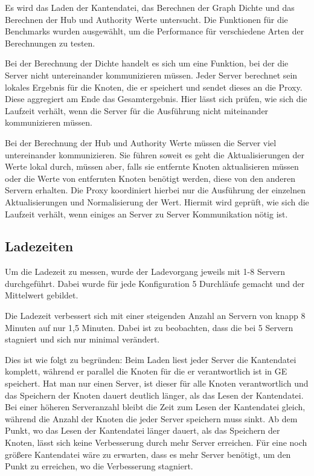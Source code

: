 Es wird das Laden der Kantendatei, das Berechnen der Graph Dichte und das Berechnen der Hub und Authority Werte untersucht. Die Funktionen für die Benchmarks wurden ausgewählt, um die Performance für verschiedene Arten der Berechnungen zu testen.

Bei der Berechnung der Dichte handelt es sich um eine Funktion, bei der die Server nicht untereinander kommunizieren müssen. Jeder Server berechnet sein lokales Ergebnis für die Knoten, die er speichert und sendet dieses an die Proxy. 
Diese aggregiert am Ende das Gesamtergebnis. Hier lässt sich prüfen, wie sich die Laufzeit verhält, wenn die Server für die Ausführung nicht miteinander kommunizieren müssen.

Bei der Berechnung der Hub und Authority Werte müssen die Server viel untereinander kommunizieren. Sie führen soweit es geht die Aktualisierungen der Werte lokal durch, müssen aber, falls sie entfernte Knoten aktualisieren müssen oder die Werte von entfernten Knoten benötigt werden, diese von den anderen Servern erhalten.
Die Proxy koordiniert hierbei nur die Ausführung der einzelnen Aktualisierungen und Normalisierung der Wert. Hiermit wird geprüft, wie sich die Laufzeit verhält, wenn einiges an Server zu Server Kommunikation nötig ist.


\subsection{Ladezeiten}

Um die Ladezeit zu messen, wurde der Ladevorgang jeweils mit 1-8 Servern durchgeführt. Dabei wurde für jede Konfiguration 5 Durchläufe gemacht und der Mittelwert gebildet.

Die Ladezeit verbessert sich mit einer steigenden Anzahl an Servern von knapp 8 Minuten auf nur 1,5 Minuten. Dabei ist zu beobachten, dass die bei 5 Servern stagniert und sich nur minimal verändert.

Dies ist wie folgt zu begründen: Beim Laden liest jeder Server die Kantendatei komplett, während er parallel die Knoten für die er verantwortlich ist in GE speichert. Hat man nur einen Server, ist dieser für alle Knoten verantwortlich
und das Speichern der Knoten dauert deutlich länger, als das Lesen der Kantendatei. Bei einer höheren Serveranzahl bleibt die Zeit zum Lesen der Kantendatei gleich, während die Anzahl der Knoten die jeder Server speichern muss sinkt.
Ab dem Punkt, wo das Lesen der Kantendatei länger dauert, als das Speichern der Knoten, lässt sich keine Verbesserung durch mehr Server erreichen. Für eine noch größere Kantendatei wäre zu erwarten, dass es mehr Server benötigt, um den Punkt zu erreichen, wo die Verbesserung stagniert.

